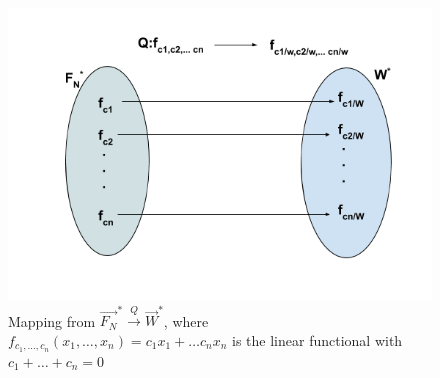\begin{figure}[h!]
\centering
\includegraphics[scale=0.5]{solutions/3/6/1/b/Wdualmap.png}
\caption{Mapping from $\vec{F_N}^* \xrightarrow{Q} \vec{W}^*$, where \\ $f_{c_1,\hdots,c_n}(x_1, \hdots , x_n) = c_1x_1 + \hdots c_nx_n$ is the linear functional with $c_1+\hdots+c_n=0$} 
\label{fig:2solutions/3/6/1/b/}
\end{figure}


